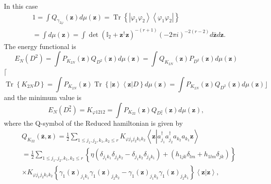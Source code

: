 \documentclass[aps,preprint]{revtex4}%
\begin{document}
In this case
\begin{align}
&  1=\int Q_{\gamma_{2\varphi}}\left(  \mathbf{z}\right)  d\mu\left(
\mathbf{z}\right)  =\operatorname*{Tr}\left\{  \left\vert \varphi_{1}%
\varphi_{2}\right\rangle \left\langle \varphi_{1}\varphi_{2}\right\vert
\right\} \nonumber\\
&  =\int d\mu\left(  \mathbf{z}\right)  =\int\det\left(  \mathbb{I}%
_{2}+\mathbf{z}^{\dagger}\mathbf{z}\right)  ^{-\left(  r+1\right)  }\left(
-2\pi i\right)  ^{-2\left(  r-2\right)  }d\mathbf{\bar{z}}d\mathbf{z.}%
\end{align}
The energy functional is
\begin{equation}
E_{N}\left(  D^{2}\right)  =\int P_{K_{2N}}\left(  \mathbf{z}\right)
Q_{D^{2}}\left(  \mathbf{z}\right)  d\mu\left(  \mathbf{z}\right)  =\int
Q_{K_{2N}}\left(  \mathbf{z}\right)  P_{D^{2}}\left(  \mathbf{z}\right)
d\mu\left(  \mathbf{z}\right)
\end{equation}
$\lceil$%
\begin{equation}
\operatorname*{Tr}\left\{  K_{2N}D\right\}  =\int P_{K_{2N}}\left(
\mathbf{z}\right)  \operatorname*{Tr}\left\{  \left\vert \mathbf{z}%
\right\rangle \left\langle \mathbf{z}\right\vert D\right\}  d\mu\left(
\mathbf{z}\right)  =\int P_{K_{2N}}\left(  \mathbf{z}\right)  Q_{D^{2}}\left(
\mathbf{z}\right)  d\mu\left(  \mathbf{z}\right)  \rfloor
\end{equation}
and the minimum value is%
\begin{equation}
E_{N}\left(  D_{\ast}^{2}\right)  =K_{\varphi1212}=\int P_{K_{22}}\left(
\mathbf{z}\right)  Q_{D_{\ast}^{2}}\left(  \mathbf{z}\right)  d\mu\left(
\mathbf{z}\right)  ,
\end{equation}
where the Q-symbol of the Reduced hamiltonian is given by
\begin{align}
&  Q_{K_{22}}\left(  \mathbf{\bar{z}},\mathbf{z}\right)  =\frac{1}{2}%
\sum_{1\leq j_{1},j_{2},k_{1},k_{2}\leq r}K_{\varphi j_{1}j_{2}k_{1}k_{2}%
}\left\langle \mathbf{z}\left\vert a_{j_{1}}^{\dagger}a_{j_{2}}^{\dagger
}a_{k_{2}}a_{k_{1}}\mathbf{z}\right.  \right\rangle \nonumber\\
&  =\frac{1}{2}\sum_{1\leq j_{1},j_{2},k_{1},k_{2}\leq r}\left\{  \eta\left(
\delta_{j_{1}k_{1}}\delta_{j_{2}k_{2}}-\delta_{j_{1}k_{2}}\delta_{j_{2}k_{1}%
}\right)  +\left(  h_{1jk}\delta_{lm}+h_{1lm}\delta_{jk}\right)  \right\}
\nonumber\\
&  \times K_{\varphi j_{1}j_{2}k_{1}k_{2}}\left\{  \gamma_{1}\left(
\mathbf{z}\right)  _{j_{1}k_{1}}\gamma_{1}\left(  \mathbf{z}\right)
_{j_{2}k_{2}}-\gamma_{1}\left(  \mathbf{z}\right)  _{j_{1}k_{2}}\gamma
_{1}\left(  \mathbf{z}\right)  _{j_{2}k_{1}}\right\}  \left\langle
\mathbf{z}\left\vert \mathbf{z}\right.  \right\rangle ,
\end{align}
\end{document}
